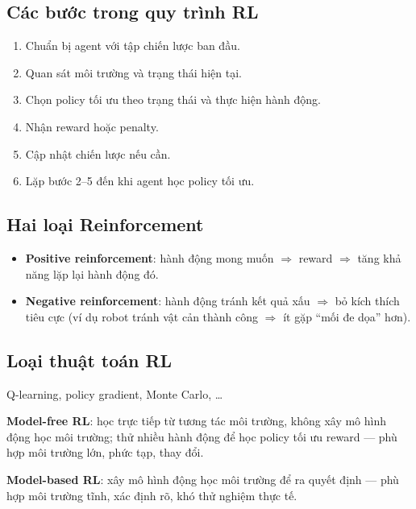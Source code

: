 \subsection{Các bước trong quy trình RL}

\begin{phuongphap}[title={Sáu bước}]
\begin{enumerate}
  \item Chuẩn bị agent với tập chiến lược ban đầu.
  \item Quan sát môi trường và trạng thái hiện tại.
  \item Chọn policy tối ưu theo trạng thái và thực hiện hành động.
  \item Nhận reward hoặc penalty.
  \item Cập nhật chiến lược nếu cần.
  \item Lặp bước 2--5 đến khi agent học policy tối ưu.
\end{enumerate}
\end{phuongphap}

\subsection{Hai loại Reinforcement}

\begin{ynghia}[title={Positive và negative reinforcement}]
\begin{itemize}
  \item \textbf{Positive reinforcement}: hành động mong muốn $\Rightarrow$ reward $\Rightarrow$ tăng khả năng lặp lại hành động đó.
  \item \textbf{Negative reinforcement}: hành động tránh kết quả xấu $\Rightarrow$ bỏ kích thích tiêu cực (ví dụ robot tránh vật cản thành công $\Rightarrow$ ít gặp ``mối đe dọa'' hơn).
\end{itemize}
\end{ynghia}

\subsection{Loại thuật toán RL}

\begin{phuongphap}[title={Ví dụ thuật toán}]
Q-learning, policy gradient, Monte Carlo, \ldots

\textbf{Model-free RL}: học trực tiếp từ tương tác môi trường, không xây mô hình động học môi trường; thử nhiều hành động để học policy tối ưu reward --- phù hợp môi trường lớn, phức tạp, thay đổi.

\textbf{Model-based RL}: xây mô hình động học môi trường để ra quyết định --- phù hợp môi trường tĩnh, xác định rõ, khó thử nghiệm thực tế.
\end{phuongphap}

